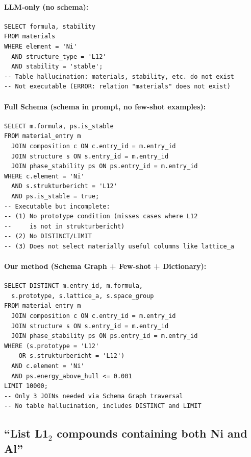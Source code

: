 \documentclass{npj-compt.mater}
\begin{document}
\paragraph{LLM-only (no schema):}
\begin{lstlisting}[basicstyle=\ttfamily\scriptsize,breaklines=true]
SELECT formula, stability
FROM materials
WHERE element = 'Ni'
  AND structure_type = 'L12'
  AND stability = 'stable';
-- Table hallucination: materials, stability, etc. do not exist
-- Not executable (ERROR: relation "materials" does not exist)
\end{lstlisting}

\paragraph{Full Schema (schema in prompt, no few-shot examples):}
\begin{lstlisting}[basicstyle=\ttfamily\scriptsize,breaklines=true]
SELECT m.formula, ps.is_stable
FROM material_entry m
  JOIN composition c ON c.entry_id = m.entry_id
  JOIN structure s ON s.entry_id = m.entry_id
  JOIN phase_stability ps ON ps.entry_id = m.entry_id
WHERE c.element = 'Ni'
  AND s.strukturbericht = 'L12'
  AND ps.is_stable = true;
-- Executable but incomplete:
-- (1) No prototype condition (misses cases where L12
--     is not in strukturbericht)
-- (2) No DISTINCT/LIMIT
-- (3) Does not select materially useful columns like lattice_a
\end{lstlisting}

\paragraph{Our method (Schema Graph + Few-shot + Dictionary):}
\begin{lstlisting}[basicstyle=\ttfamily\scriptsize,breaklines=true]
SELECT DISTINCT m.entry_id, m.formula,
  s.prototype, s.lattice_a, s.space_group
FROM material_entry m
  JOIN composition c ON c.entry_id = m.entry_id
  JOIN structure s ON s.entry_id = m.entry_id
  JOIN phase_stability ps ON ps.entry_id = m.entry_id
WHERE (s.prototype = 'L12'
    OR s.strukturbericht = 'L12')
  AND c.element = 'Ni'
  AND ps.energy_above_hull <= 0.001
LIMIT 10000;
-- Only 3 JOINs needed via Schema Graph traversal
-- No table hallucination, includes DISTINCT and LIMIT
\end{lstlisting}

\subsection{``List L1$_2$ compounds containing both Ni and Al''}
\end{document}
